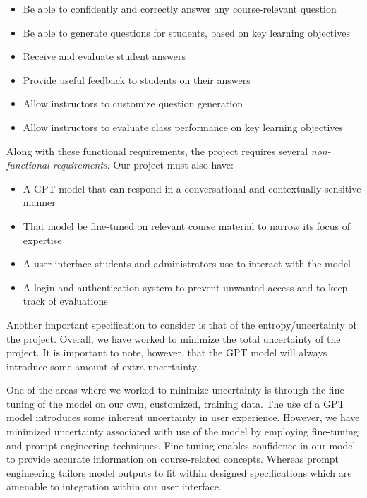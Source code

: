 \documentclass[12pt,a4paper]{article}
\begin{document}
    \begin{itemize}
        \label{functionalReqs}

        \item Be able to confidently and correctly answer any course-relevant question
        \item Be able to generate questions for students, based on key learning objectives
        \item Receive and evaluate student answers
        \item Provide useful feedback to students on their answers
        \item Allow instructors to customize question generation
        \item Allow instructors to evaluate class performance on key learning objectives
    \end{itemize}

    Along with these functional requirements, the project requires several \textit{non-functional
    requirements}.  Our project must also have:

    \begin{itemize}
        \label{nonFunctionalReqs}
        \item A GPT model that can respond in a conversational and contextually sensitive manner
        \item That model be fine-tuned on relevant course material to narrow its focus of expertise
        \item A user interface students and administrators use to interact with the model
        \item A login and authentication system to prevent unwanted access and to keep track of evaluations
    \end{itemize}

    Another important specification to consider is that of the entropy/uncertainty of the project.
    Overall, we have worked to minimize the total uncertainty of the project.  It is important to note,
    however, that the GPT model will always introduce some amount of extra uncertainty.

    One of the areas where we worked to minimize uncertainty is through the fine-tuning of the model on our
    own, customized, training data.  The use of a GPT model introduces some inherent uncertainty in user
    experience. However, we have minimized uncertainty associated with use of the model by employing
    fine-tuning and prompt engineering techniques. Fine-tuning enables confidence in our model to
    provide accurate information on course-related concepts. Whereas prompt engineering tailors
    model outputs to fit within designed specifications which are amenable to integration within
    our user interface.
\end{document}
